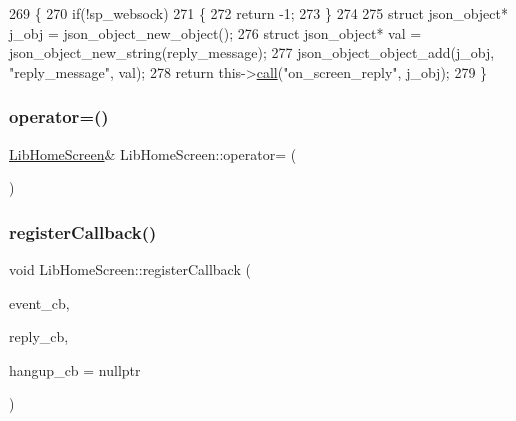 \begin{DoxyCode}
269 \{
270     \textcolor{keywordflow}{if}(!sp\_websock)
271     \{
272         \textcolor{keywordflow}{return} -1;
273     \}
274 
275     \textcolor{keyword}{struct }json\_object* j\_obj = json\_object\_new\_object();
276     \textcolor{keyword}{struct }json\_object* val = json\_object\_new\_string(reply\_message);
277     json\_object\_object\_add(j\_obj, \textcolor{stringliteral}{"reply\_message"}, val);
278     \textcolor{keywordflow}{return} this->\hyperlink{class_lib_home_screen_a527b49dcfe581be6275d0eb2236ba37f}{call}(\textcolor{stringliteral}{"on\_screen\_reply"}, j\_obj);
279 \}
\end{DoxyCode}
\mbox{\label{class_lib_home_screen_a23bc17798453cfca50904562736f6b25}} 
\subsubsection{\texorpdfstring{operator=()}{operator=()}}
{\footnotesize\ttfamily \hyperlink{class_lib_home_screen}{Lib\+Home\+Screen}\& Lib\+Home\+Screen\+::operator= (\begin{DoxyParamCaption}\item[{const \hyperlink{class_lib_home_screen}{Lib\+Home\+Screen} \&}]{ }\end{DoxyParamCaption})\hspace{0.3cm}{\ttfamily [delete]}}

\mbox{\label{class_lib_home_screen_a2789e8a5372202cc36f48e71dbb9b7cf}} 
\subsubsection{\texorpdfstring{register\+Callback()}{registerCallback()}}
{\footnotesize\ttfamily void Lib\+Home\+Screen\+::register\+Callback (\begin{DoxyParamCaption}\item[{void($\ast$)(const std\+::string \&\hyperlink{structevent}{event}, struct json\+\_\+object $\ast$event\+\_\+contents)}]{event\+\_\+cb,  }\item[{void($\ast$)(struct json\+\_\+object $\ast$reply\+\_\+contents)}]{reply\+\_\+cb,  }\item[{void($\ast$)(void)}]{hangup\+\_\+cb = {\ttfamily nullptr} }\end{DoxyParamCaption})}

